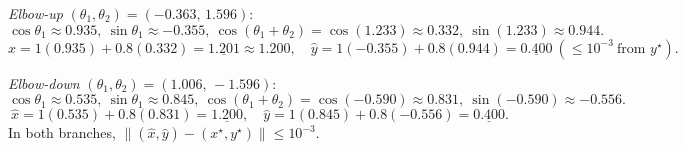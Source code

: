 \documentclass[11pt]{article}
\begin{document}
\emph{Elbow-up} $(\theta_1,\theta_2)=(-0.363,\,1.596)$:
\[
\cos\theta_1\approx 0.935,\ \sin\theta_1\approx -0.355,\ 
\cos(\theta_1+\theta_2)=\cos(1.233)\approx 0.332,\ 
\sin(1.233)\approx 0.944.
\]
\[
\hat x=1(0.935)+0.8(0.332)=\underline{1.201}\approx 1.200,\quad
\hat y=1(-0.355)+0.8(0.944)=\underline{0.400}\ (\le 10^{-3}\ \text{from }y^\star).
\]

\emph{Elbow-down} $(\theta_1,\theta_2)=(1.006,\,-1.596)$:
\[
\cos\theta_1\approx 0.535,\ \sin\theta_1\approx 0.845,\ 
\cos(\theta_1+\theta_2)=\cos(-0.590)\approx 0.831,\ 
\sin(-0.590)\approx -0.556.
\]
\[
\hat x=1(0.535)+0.8(0.831)=\underline{1.200},\quad
\hat y=1(0.845)+0.8(-0.556)=\underline{0.400}.
\]
In both branches, $\|(\hat x,\hat y)-(x^\star,y^\star)\|\le 10^{-3}$.
\end{document}
